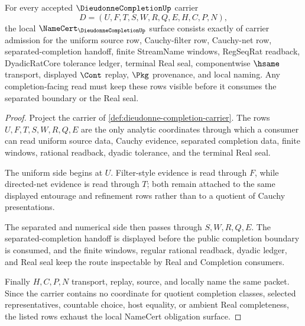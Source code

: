 \begin{theorem}
\label{thm:dieudonne-completion-namecert-obligations}
For every accepted $\DieudonneCompletionUp$ carrier
$$
D=(U,F,T,S,W,R,Q,E,H,C,P,N),
$$
the local $\NameCert_{\DieudonneCompletionUp}$ surface consists exactly of carrier admission for the uniform source row, Cauchy-filter row, Cauchy-net row, separated-completion handoff, finite StreamName windows, RegSeqRat readback, DyadicRatCore tolerance ledger, terminal Real seal, componentwise $\hsame$ transport, displayed $\Cont$ replay, $\Pkg$ provenance, and local naming. Any completion-facing read must keep these rows visible before it consumes the separated boundary or the Real seal.
\end{theorem}
\begin{proof}
Project the carrier of \autoref{def:dieudonne-completion-carrier}. The rows $U,F,T,S,W,R,Q,E$ are the only analytic coordinates through which a consumer can read uniform source data, Cauchy evidence, separated completion data, finite windows, rational readback, dyadic tolerance, and the terminal Real seal.

The uniform side begins at $U$. Filter-style evidence is read through $F$, while directed-net evidence is read through $T$; both remain attached to the same displayed entourage and refinement rows rather than to a quotient of Cauchy presentations.

The separated and numerical side then passes through $S,W,R,Q,E$. The separated-completion handoff is displayed before the public completion boundary is consumed, and the finite windows, regular rational readback, dyadic ledger, and Real seal keep the route inspectable by Real and Completion consumers.

Finally $H,C,P,N$ transport, replay, source, and locally name the same packet. Since the carrier contains no coordinate for quotient completion classes, selected representatives, countable choice, host equality, or ambient Real completeness, the listed rows exhaust the local NameCert obligation surface.
\end{proof}

